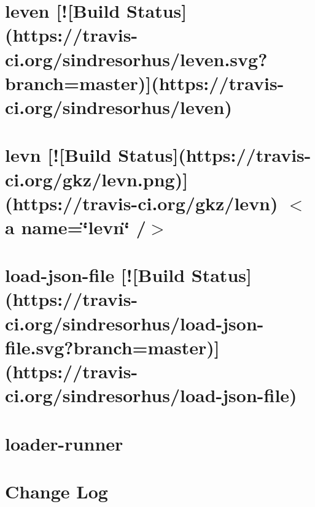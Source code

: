 \documentclass[twoside]{book}
\newcommand{\+}{\discretionary{\mbox{\scriptsize$\hookleftarrow$}}{}{}}
\begin{document}
\chapter{leven \mbox{[}!\mbox{[}Build Status\mbox{]}(https\+://travis-\/ci.org/sindresorhus/leven.svg?branch=master)\mbox{]}(https\+://travis-\/ci.org/sindresorhus/leven)}
\label{md__c_1_workspace_demo_src_main_script_node_modules_leven_readme}

\chapter{levn \mbox{[}!\mbox{[}Build Status\mbox{]}(https\+://travis-\/ci.org/gkz/levn.png)\mbox{]}(https\+://travis-\/ci.org/gkz/levn) $<$a name=\char`\"{}levn\char`\"{} /$>$}
\label{md__c_1_workspace_demo_src_main_script_node_modules_levn__r_e_a_d_m_e}

\chapter{load-\/json-\/file \mbox{[}!\mbox{[}Build Status\mbox{]}(https\+://travis-\/ci.org/sindresorhus/load-\/json-\/file.svg?branch=master)\mbox{]}(https\+://travis-\/ci.org/sindresorhus/load-\/json-\/file)}
\label{md__c_1_workspace_demo_src_main_script_node_modules_load-json-file_readme}

\chapter{loader-\/runner}
\label{md__c_1_workspace_demo_src_main_script_node_modules_loader-runner__r_e_a_d_m_e}

\chapter{Change Log}
\label{md__c_1_workspace_demo_src_main_script_node_modules_loader-utils__c_h_a_n_g_e_l_o_g}

\end{document}
